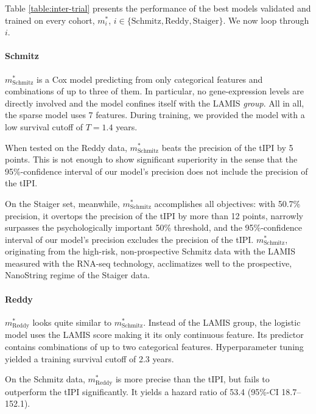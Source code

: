 Table \ref{table:inter-trial} presents the performance of the best models validated and trained on 
every cohort, $m_i^*$, $i \in \{ \text{Schmitz}, \text{Reddy}, \text{Staiger} \}$. We now loop 
through $i$.



\paragraph{Schmitz}
$m^*_\text{Schmitz}$ is a Cox model predicting from only categorical features and combinations of up to 
three of them. In particular, no gene-expression levels are directly involved and the model confines 
itself with the LAMIS \textit{group}. All in all, the sparse model uses \num{7} features. During 
training, we provided the model with a low survival cutoff of $T = \num{1.4}$ years.

When tested on the Reddy data, $m^*_\text{Schmitz}$ beats the precision of the tIPI by 5 points. This 
is not enough to show significant superiority in the sense that the \num{95}\%-confidence interval 
of our model's precision does not include the precision of the tIPI.

On the Staiger set, meanwhile, $m^*_\text{Schmitz}$ accomplishes all objectives: with 
\num{50.7}\% precision, it overtops the precision of the tIPI by more than 12 points, narrowly 
surpasses the 
psychologically important \num{50}\% threshold, and the \num{95}\%-confidence interval of our model's 
precision excludes the precision of the tIPI. $m^*_\text{Schmitz}$, originating from 
the high-risk, non-prospective Schmitz data with the LAMIS measured with the 
RNA-seq technology, acclimatizes well to the prospective, NanoString regime of the Staiger data. 

\paragraph{Reddy}
$m^*_\text{Reddy}$ looks quite similar to $m^*_\text{Schmitz}$. Instead of the LAMIS group, the 
logistic model uses the LAMIS score making it its only continuous feature. Its predictor contains 
combinations of up to two categorical features. Hyperparameter tuning yielded a training survival 
cutoff of \num{2.3} years. 

On the Schmitz data, $m^*_\text{Reddy}$ is more precise than the tIPI, but fails to outperform the 
tIPI significantly. It yields a hazard ratio of \num{53.4} 
(\num{95}\%-CI \num{18.7}--\num{152.1}).

